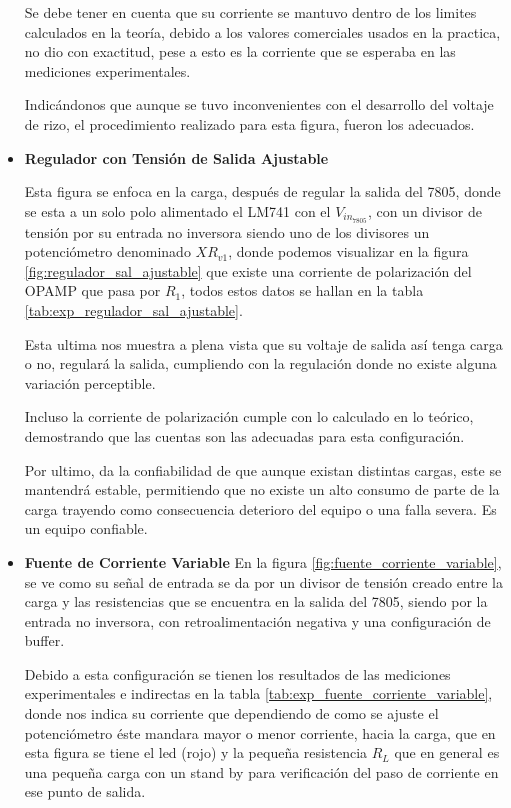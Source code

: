\begin{itemize}
                Se debe tener en cuenta que su corriente se mantuvo dentro de los limites calculados en la teoría, debido a los valores comerciales usados en la practica, no dio con exactitud, pese a esto es la corriente que se esperaba en las mediciones experimentales.

                Indicándonos que aunque se tuvo inconvenientes con el desarrollo del voltaje de rizo, el procedimiento realizado para esta figura, fueron los adecuados.


            \item \textbf{Regulador con Tensión de Salida Ajustable}

                Esta figura se enfoca en la carga, después de regular la salida del 7805, donde se esta a un solo polo alimentado el LM741 con el  $V_{in_{7805}}$, con un divisor de tensión por su entrada no inversora siendo uno de los divisores un potenciómetro denominado $XR_{v1}$, donde podemos visualizar en la figura \ref{fig:regulador_sal_ajustable} que existe una corriente de polarización del OPAMP que pasa por $R_1$, todos estos datos se hallan en la tabla \ref{tab:exp_regulador_sal_ajustable}. 

                Esta ultima nos muestra a plena vista que su voltaje de salida así tenga carga o no, regulará la salida, cumpliendo con la regulación donde no existe alguna variación perceptible.

                Incluso la corriente de polarización cumple con lo calculado en lo teórico, demostrando que las cuentas son las adecuadas para esta configuración. 

                Por ultimo, da la confiabilidad de que aunque existan distintas cargas, este se mantendrá estable, permitiendo que no existe un alto consumo de parte de la carga trayendo como consecuencia deterioro del equipo o una falla severa.
                Es un equipo confiable.

            \item \textbf{Fuente de Corriente Variable}   
                En la figura \ref{fig:fuente_corriente_variable}, se ve como su señal de entrada se da por un divisor de tensión creado entre la carga y las resistencias que se encuentra en la salida del 7805, siendo por la entrada no inversora, con retroalimentación negativa y  una configuración de buffer.

                Debido a esta configuración se tienen los resultados de las mediciones experimentales e indirectas en la tabla \ref{tab:exp_fuente_corriente_variable}, donde nos indica su corriente que dependiendo de como se ajuste el potenciómetro éste mandara mayor o menor corriente, hacia la carga, que en esta figura se tiene el led (rojo) y la pequeña resistencia $R_L$ que en general es una pequeña carga con un stand by para verificación del paso de corriente en ese punto de salida.


\end{itemize}
